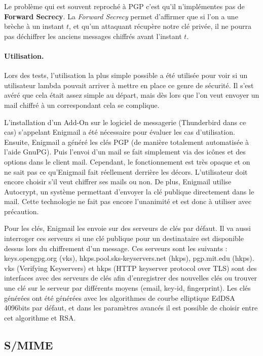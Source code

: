 Le problème qui est souvent reproché à PGP c'est qu'il n'implémentes pas de \textbf{Forward Secrecy}. La \textit{Forward Secrecy} permet d'affirmer que si l'on a une brèche à un instant $t$, et qu'un attaquant récupère notre clé privée, il ne pourra pas déchiffrer les anciens messages chiffrés avant l'instant $t$.
\paragraph*{Utilisation.}
Lors des tests, l’utilisation la plus simple possible a été utilisée pour voir si un utilisateur lambda pouvait arriver à mettre en place ce genre de sécurité. Il s’est avéré que cela était assez simple au départ, mais dès lors que l'on veut envoyer un mail chiffré à un correspondant cela se complique.

 L'installation d'un Add-On sur le logiciel de messagerie (Thunderbird dans ce cas) s’appelant Enigmail a été nécessaire pour évaluer les cas d'utilisation. Ensuite, Enigmail a généré les clés PGP (de manière totalement automatisée à l'aide GnuPG). Puis l'envoi d'un mail se fait simplement via des icônes et des options dans le client mail. Cependant, le fonctionnement est très opaque et on ne sait pas ce qu'Enigmail fait réellement derrière les décors. L’utilisateur doit encore choisir s’il veut chiffrer ses mails ou non. De plus, Enigmail utilise Autocrypt, un système permettant d'envoyer la clé publique directement dans le mail. Cette technologie ne fait pas encore l'unanimité et est donc à utiliser avec précaution.
 
 Pour les clés, Enigmail les envoie sur des serveurs de clés par défaut. Il va aussi interroger ces serveurs si une clé publique pour un destinataire est disponible dessus lors du chiffrement d'un message. Ces serveurs sont les suivants : keys.opengpg.org (vks), hkps.pool.sks-keyservers.net (hkps), pgp.mit.edu (hkps). vks (Verifying Keyservers) et hkps (HTTP keyserver protocol over TLS) sont des interfaces avec des serveurs de clés afin d'enregistrer des nouvelles clés ou trouver une clé sur le serveur par différents moyens (email, key-id, fingerprint). Les clés générées ont été générées avec les algorithmes de courbe elliptique EdDSA 4096bits par défaut, et dans les paramètres avancés il est possible de choisir entre cet algorithme et RSA.
\subsection{S/MIME}
\label{protocols:SMIME}
